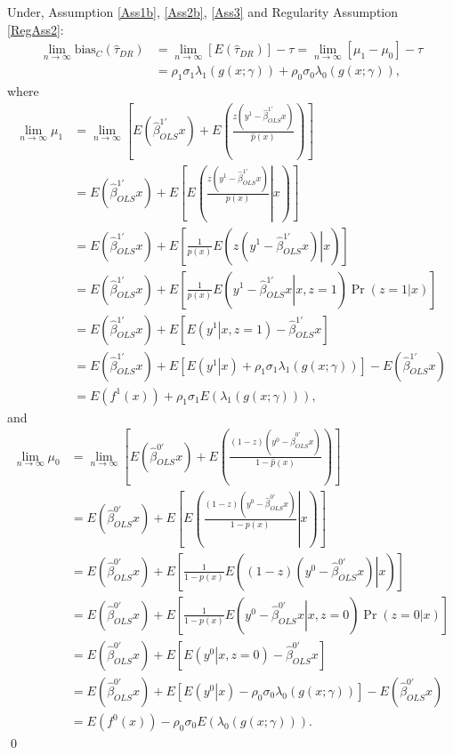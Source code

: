 \documentclass[11pt]{article}
\newcommand{\limes}{\lim \limits_{n\to\infty}}
\begin{document}
\vspace{5mm}
\noindent Under, Assumption \ref{Ass1b}, \ref{Ass2b}, \ref{Ass3} and Regularity Assumption \ref{RegAss2}: 
\begin{align*}
\limes \mbox{bias}_C(\hat \tau_{DR})&=\limes \left[E(\hat\tau_{DR}) \right]- \tau= \limes\left[ \mu_1-\mu_0 \right]- \tau\\ &=\rho_1\sigma_1\lambda_1(g(x; \gamma))+\rho_0\sigma_0\lambda_0(g(x; \gamma)),
\end{align*}
where
\begin{align*}
\limes \mu_1&=\limes \left[E(\hat\beta^{1'}_{OLS}x) +E\left(\frac{z(y^1-\hat\beta^{1'}_{OLS}x)}{\hat p(x)}\right)\right] \\
&= E(\hat\beta^{1'}_{OLS}x) +E\left[ E\left(\left.\frac{z(y^1-\hat\beta^{1'}_{OLS}x)}{p(x)}\right| x \right)\right] \\
&=E(\hat\beta^{1'}_{OLS}x) +E\left[\frac{1}{p(x)} E\left(\left.z(y^1-\hat\beta^{1'}_{OLS}x)\right| x \right)\right] \\
&=E(\hat\beta^{1'}_{OLS}x) +E\left[\frac{1}{p(x)} E\left(\left.y^1-\hat\beta^{1'}_{OLS}x\right| x, z=1 \right)\Pr(z=1|x)\right] \\
&=E(\hat\beta^{1'}_{OLS}x) +E\left[E\left(\left.y^1\right| x, z=1 \right) -\hat\beta^{1'}_{OLS}x\right] \\
&=E(\hat\beta^{1'}_{OLS}x) +E\left[E\left(\left.y^1\right| x \right)+\rho_1 \sigma_1 \lambda_1(g(x; \gamma)) \right] -E(\hat\beta^{1'}_{OLS}x)\\
&=E\left(f^1(x) \right)+\rho_1 \sigma_1 E\left(\lambda_1(g(x; \gamma)) \right),
\end{align*}
and
\begin{align*}
\limes \mu_0&=\limes\left[E(\hat\beta^{0'}_{OLS}x) +E\left(\frac{(1-z)(y^0-\hat\beta^{0'}_{OLS}x)}{1-\hat p(x)}\right)\right] \\
&= E(\hat\beta^{0'}_{OLS}x) +E\left[ E\left(\left.\frac{(1-z)(y^0-\hat\beta^{0'}_{OLS}x)}{1-p(x)}\right| x \right)\right]\\
&=E(\hat\beta^{0'}_{OLS}x) +E\left[\frac{1}{1-p(x)} E\left(\left.(1-z)(y^0-\hat\beta^{0'}_{OLS}x)\right| x \right)\right] \\
&=E(\hat\beta^{0'}_{OLS}x) +E\left[\frac{1}{1-p(x)} E\left(\left.y^0-\hat\beta^{0'}_{OLS}x\right| x, z=0 \right)\Pr(z=0|x)\right] \\
&=E(\hat\beta^{0'}_{OLS}x) +E\left[E\left(\left.y^0\right| x, z=0 \right) -\hat\beta^{0'}_{OLS}x\right] \\
&=E(\hat\beta^{0'}_{OLS}x) +E\left[E\left(\left.y^0\right| x \right)-\rho_0 \sigma_0 \lambda_0(g(x; \gamma)) \right] -E(\hat\beta^{0'}_{OLS}x)\\
&=E\left(f^0(x) \right)-\rho_0 \sigma_0 E\left(\lambda_0(g(x; \gamma)) \right). 
\end{align*} \qed
\end{document}
